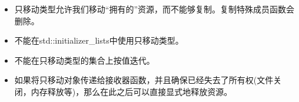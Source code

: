 \begin{itemize}
	\item 只移动类型允许我们移动“拥有的”资源，而不能够复制。复制特殊成员函数会删除。
	\item 不能在std::initializer\_lists中使用只移动类型。
	\item 不能在只移动类型的集合上按值迭代。
	\item 如果将只移动对象传递给接收器函数，并且确保已经失去了所有权(文件关闭，内存释放等)，那么在此之后可以直接显式地释放资源。
\end{itemize}


\newpage